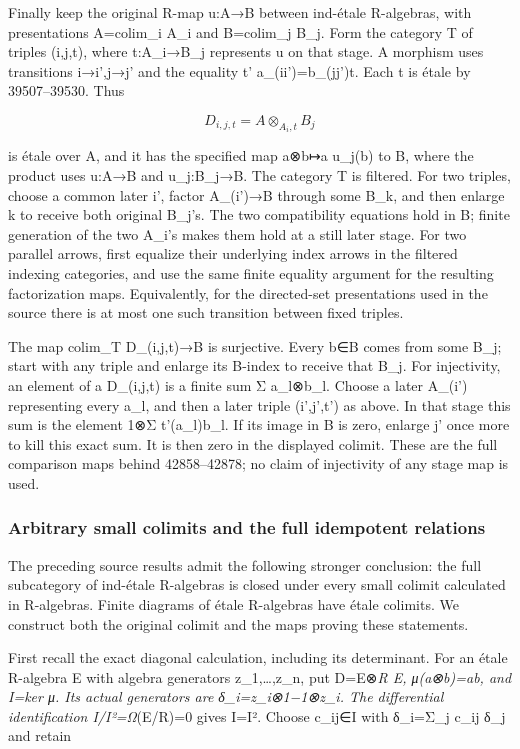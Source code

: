 Finally keep the original R-map u:A→B between ind-étale R-algebras, with presentations A=colim\_i A\_i and B=colim\_j B\_j. Form the category T of triples (i,j,t), where t:A\_i→B\_j represents u on that stage. A morphism uses transitions i→i',j→j' and the equality t' a\_(ii')=b\_(jj')t. Each t is étale by 39507--39530. Thus

\[
D_{i,j,t}=A\otimes_{A_i,t}B_j
\]

is étale over A, and it has the specified map a⊗b↦a u\_j(b) to B, where the product uses u:A→B and u\_j:B\_j→B. The category T is filtered. For two triples, choose a common later i', factor A\_(i')→B through some B\_k, and then enlarge k to receive both original B\_j's. The two compatibility equations hold in B; finite generation of the two A\_i's makes them hold at a still later stage. For two parallel arrows, first equalize their underlying index arrows in the filtered indexing categories, and use the same finite equality argument for the resulting factorization maps. Equivalently, for the directed-set presentations used in the source there is at most one such transition between fixed triples.

The map colim\_T D\_(i,j,t)→B is surjective. Every b∈B comes from some B\_j; start with any triple and enlarge its B-index to receive that B\_j. For injectivity, an element of a D\_(i,j,t) is a finite sum Σ a\_l⊗b\_l. Choose a later A\_(i') representing every a\_l, and then a later triple (i',j',t') as above. In that stage this sum is the element 1⊗Σ t'(a\_l)b\_l. If its image in B is zero, enlarge j' once more to kill this exact sum. It is then zero in the displayed colimit. These are the full comparison maps behind 42858--42878; no claim of injectivity of any stage map is used.

\subsubsection{Arbitrary small colimits and the full idempotent relations}\label{algebra-proof-059-arbitrary-small-colimits-and-the-full-idempotent-relations}

The preceding source results admit the following stronger conclusion: the full subcategory of ind-étale R-algebras is closed under every small colimit calculated in R-algebras. Finite diagrams of étale R-algebras have étale colimits. We construct both the original colimit and the maps proving these statements.

First recall the exact diagonal calculation, including its determinant. For an étale R-algebra E with algebra generators z\_1,\ldots,z\_n, put D=E⊗\emph{R E, μ(a⊗b)=ab, and I=ker μ. Its actual generators are δ\_i=z\_i⊗1−1⊗z\_i. The differential identification I/I²=Ω}(E/R)=0 gives I=I². Choose c\_ij∈I with δ\_i=Σ\_j c\_ij δ\_j and retain

